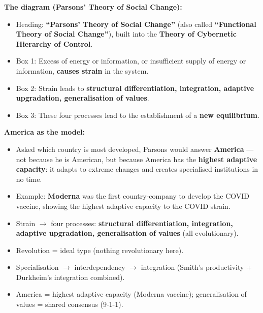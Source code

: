 \begin{DataFact}
\textbf{The diagram (Parsons' Theory of Social Change):}
\begin{itemize}
\item Heading: \textbf{``Parsons' Theory of Social Change''} (also called \textbf{``Functional Theory of Social Change''}), built into the \textbf{Theory of Cybernetic Hierarchy of Control}.
\item Box 1: Excess of energy or information, or insufficient supply of energy or information, \textbf{causes strain} in the system.
\item Box 2: Strain leads to \textbf{structural differentiation, integration, adaptive upgradation, generalisation of values}.
\item Box 3: These four processes lead to the establishment of a \textbf{new equilibrium}.
\end{itemize}
\end{DataFact}

\begin{DataFact}
\textbf{America as the model:}
\begin{itemize}
\item Asked which country is most developed, Parsons would answer \textbf{America} --- not because he is American, but because America has the \textbf{highest adaptive capacity}: it adapts to extreme changes and creates specialised institutions in no time.
\item Example: \textbf{Moderna} was the first country-company to develop the COVID vaccine, showing the highest adaptive capacity to the COVID strain.
\end{itemize}
\end{DataFact}

\begin{QuickRevision}
\begin{itemize}
\item Strain $\rightarrow$ four processes: \textbf{structural differentiation, integration, adaptive upgradation, generalisation of values} (all evolutionary).
\item Revolution = ideal type (nothing revolutionary here).
\item Specialisation $\rightarrow$ interdependency $\rightarrow$ integration (Smith's productivity + Durkheim's integration combined).
\item America = highest adaptive capacity (Moderna vaccine); generalisation of values = shared consensus (9-1-1).
\end{itemize}
\end{QuickRevision}


